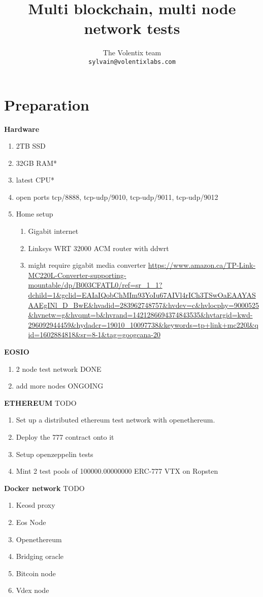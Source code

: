 \documentclass[]{article}
\title{Multi blockchain, multi node network tests}
\author{
		The Volentix team\\
	\texttt{sylvain@volentixlabs.com}
}
\begin{document}
\maketitle


\section{Preparation}

   \textbf{Hardware}  
   \begin{enumerate}
   	\item 2TB SSD
   	\item 32GB RAM* 
   	\item latest CPU* 
   	\item open ports tcp/8888, tcp-udp/9010, tcp-udp/9011, tcp-udp/9012
   	\item Home setup
   	\begin{enumerate} 
   		\item Gigabit internet
   		\item Linksys WRT 32000 ACM router with ddwrt
   		\item might require gigabit media converter
	   	\url{	https://www.amazon.ca/TP-Link-MC220L-Converter-supporting-mountable/dp/B003CFATL0/ref=sr_1_1?dchild=1&gclid=EAIaIQobChMIm93YoIu67AIVl4rICh3TSwOaEAAYASAAEgINl_D_BwE&hvadid=283962748757&hvdev=c&hvlocphy=9000525&hvnetw=g&hvqmt=b&hvrand=1421286694374843535&hvtargid=kwd-296092944459&hydadcr=19010_10097738&keywords=tp+link+mc220l&qid=1602884818&sr=8-1&tag=googcana-20}
	\end{enumerate}		 	  
   \end{enumerate}		
   \textbf{EOSIO}  
   \begin{enumerate}
		\item 2 node test network {\color{green} DONE} 
			\item add more nodes {\color{yellow} ONGOING} 
   	  \end{enumerate}   
	 \textbf{ETHEREUM} {\color{red} TODO} 
	   \begin{enumerate}
	   	\item Set up a distributed ethereum test network with openethereum. \item Deploy the 777 contract onto it
	   	\item Setup openzeppelin tests
	   	\item Mint 2 test pools of 100000.00000000 ERC-777 VTX on Ropsten
	   	\end{enumerate}       
   \textbf{Docker network}	  {\color{red} TODO} 
\begin{enumerate}
	\item Keosd proxy
		\item Eos Node
	\item Openethereum
	\item Bridging oracle
	\item Bitcoin node
	\item Vdex node
\end{enumerate}   
			 
\end{document}

